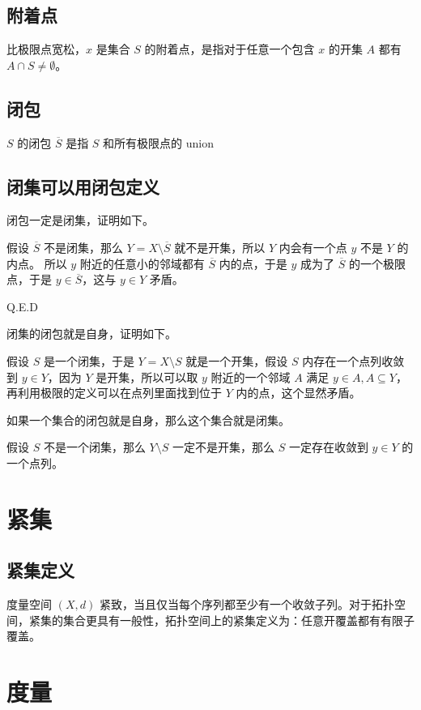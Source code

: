 \subsection{附着点}

比极限点宽松，$x$ 是集合 $S$ 的附着点，是指对于任意一个包含 $x$ 的开集 $A$ 都有 $A \cap S \ne \emptyset$。

\subsection{闭包}
$S$ 的闭包 $\overline{S}$ 是指 $S$ 和所有极限点的 union

\subsection{闭集可以用闭包定义}

闭包一定是闭集，证明如下。

假设 $\overline{S}$ 不是闭集，那么 $ Y = X \setminus \overline{S}$ 就不是开集，所以 $Y$ 内会有一个点 $y$ 不是 $ Y$ 的内点。
所以 $y$ 附近的任意小的邻域都有 $ \overline{S}$ 内的点，于是 $y$ 成为了 $\overline{S}$ 的一个极限点，于是 $y \in \overline{S}$，这与 $y \in Y$ 矛盾。

Q.E.D

闭集的闭包就是自身，证明如下。

假设 $S$ 是一个闭集，于是 $Y = X \setminus S$ 就是一个开集，假设 $S$ 内存在一个点列收敛到 $y \in Y$，因为 $Y$ 是开集，所以可以取 $y$ 附近的一个邻域 $A$ 满足 
$ y \in A, A \subseteq Y $，再利用极限的定义可以在点列里面找到位于 $Y$ 内的点，这个显然矛盾。

如果一个集合的闭包就是自身，那么这个集合就是闭集。

假设 $S$ 不是一个闭集，那么 $ Y \setminus S$ 一定不是开集，那么 $ S $ 一定存在收敛到 $ y \in Y$ 的一个点列。 

\section{紧集}

\subsection{紧集定义}

度量空间 $(X,d)$ 紧致，当且仅当每个序列都至少有一个收敛子列。对于拓扑空间，紧集的集合更具有一般性，拓扑空间上的紧集定义为：任意开覆盖都有有限子覆盖。

\section{度量}

